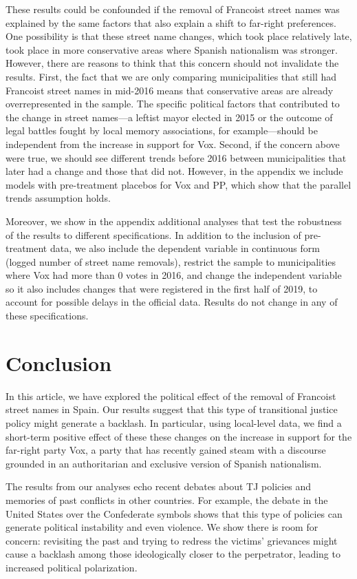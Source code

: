 \documentclass[12pt, notitlepage]{article}
\begin{document}
These results could be confounded if the removal of Francoist street names was explained by the same factors that also explain a shift to far-right preferences.
One possibility is that these street name changes, which took place relatively late, took place in more conservative areas where Spanish nationalism was stronger.
However, there are reasons to think that this concern should not invalidate the results.
First, the fact that we are only comparing municipalities that still had Francoist street names in mid-2016 means that conservative areas are already overrepresented in the sample.
The specific political factors that contributed to the change in street names---a leftist mayor elected in 2015 or the outcome of legal battles fought by local memory associations, for example---should be independent from the increase in support for Vox.
Second, if the concern above were true, we should see different trends before 2016 between municipalities that later had a change and those that did not.
However, in the appendix we include models with pre-treatment placebos for Vox and PP, which show that the parallel trends assumption holds.

Moreover, we show in the appendix additional analyses that test the robustness of the results to different specifications.
In addition to the inclusion of pre-treatment data, we also include the dependent variable in continuous form (logged number of street name removals), restrict the sample to municipalities where Vox had more than 0 votes in 2016, and change the independent variable so it also includes changes that were registered in the first half of 2019, to account for possible delays in the official data.
Results do not change in any of these specifications.

\section*{Conclusion}

In this article, we have explored the political effect of the removal of Francoist street names in Spain.
Our results suggest that this type of transitional justice policy might generate a backlash.
In particular, using local-level data, we find a short-term positive effect of these these changes on the increase in support for the far-right party Vox, a party that has recently gained steam with a discourse grounded in an authoritarian and exclusive version of Spanish nationalism.

The results from our analyses echo recent debates about TJ policies and memories of past conflicts in other countries. For example, the debate in the United States over the Confederate symbols shows that this type of policies can generate political instability and even violence. We show there is room for concern: revisiting the past and trying to redress the victims' grievances might cause a backlash among those ideologically closer to the perpetrator, leading to increased political polarization.
\end{document}
